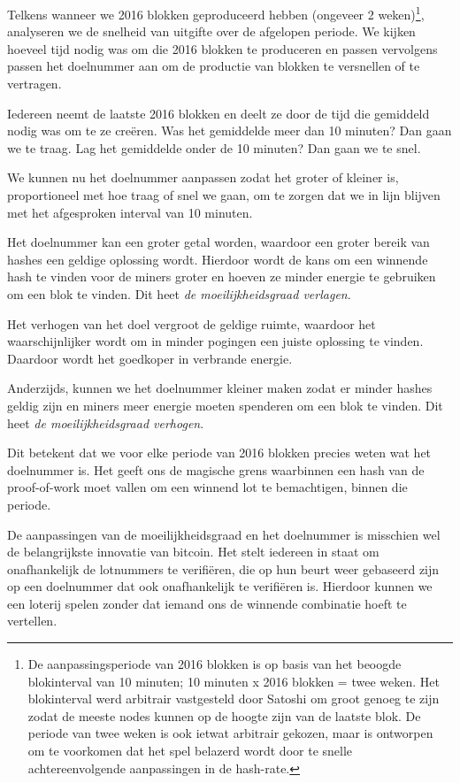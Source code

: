 \documentclass[
  letterpaper,
]{scrbook}
\begin{document}
Telkens wanneer we 2016 blokken geproduceerd hebben (ongeveer 2
weken)\footnote{De aanpassingsperiode van 2016 blokken is op basis van
  het beoogde blokinterval van 10 minuten; 10 minuten x 2016 blokken =
  twee weken. Het blokinterval werd arbitrair vastgesteld door Satoshi
  om groot genoeg te zijn zodat de meeste nodes kunnen op de hoogte zijn
  van de laatste blok. De periode van twee weken is ook ietwat arbitrair
  gekozen, maar is ontworpen om te voorkomen dat het spel belazerd wordt
  door te snelle achtereenvolgende aanpassingen in de hash-rate.},
analyseren we de snelheid van uitgifte over de afgelopen periode. We
kijken hoeveel tijd nodig was om die 2016 blokken te produceren en
passen vervolgens passen het doelnummer aan om de productie van blokken
te versnellen of te vertragen.

Iedereen neemt de laatste 2016 blokken en deelt ze door de tijd die
gemiddeld nodig was om te ze creëren. Was het gemiddelde meer dan 10
minuten? Dan gaan we te traag. Lag het gemiddelde onder de 10 minuten?
Dan gaan we te snel.

We kunnen nu het doelnummer aanpassen zodat het groter of kleiner is,
proportioneel met hoe traag of snel we gaan, om te zorgen dat we in lijn
blijven met het afgesproken interval van 10 minuten.

Het doelnummer kan een groter getal worden, waardoor een groter bereik
van hashes een geldige oplossing wordt. Hierdoor wordt de kans om een
winnende hash te vinden voor de miners groter en hoeven ze minder
energie te gebruiken om een blok te vinden. Dit heet \emph{de
moeilijkheidsgraad verlagen}.

{Het verhogen van het doel vergroot de geldige ruimte, waardoor het
waarschijnlijker wordt om in minder pogingen een juiste oplossing te
vinden. Daardoor wordt het goedkoper in verbrande energie.}

Anderzijds, kunnen we het doelnummer kleiner maken zodat er minder
hashes geldig zijn en miners meer energie moeten spenderen om een blok
te vinden. Dit heet \emph{de moeilijkheidsgraad verhogen}.

Dit betekent dat we voor elke periode van 2016 blokken precies weten wat
het doelnummer is. Het geeft ons de magische grens waarbinnen een hash
van de proof-of-work moet vallen om een winnend lot te bemachtigen,
binnen die periode.

De aanpassingen van de moeilijkheidsgraad en het doelnummer is misschien
wel de belangrijkste innovatie van bitcoin. Het stelt iedereen in staat
om onafhankelijk de lotnummers te verifiëren, die op hun beurt weer
gebaseerd zijn op een doelnummer dat ook onafhankelijk te verifiëren is.
Hierdoor kunnen we een loterij spelen zonder dat iemand ons de winnende
combinatie hoeft te vertellen.
\end{document}
